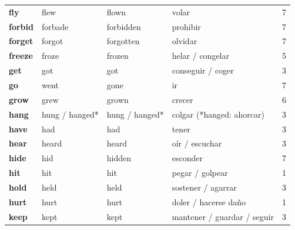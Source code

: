 \documentclass[11pt,a4paper]{article}
\begin{document}
\begin{longtable}{>{\bfseries}p{2.6cm}p{3.4cm}p{3.6cm}>{\raggedright\arraybackslash}p{6.0cm}c}
\textcolor{azulO}{fly} & \textcolor{azulO}{flew} & \textcolor{azulO}{flown} & \textcolor{azulO}{volar} & \textcolor{azulO}{7}\\
\textcolor{azulO}{forbid} & \textcolor{azulO}{forbade} & \textcolor{azulO}{forbidden} & \textcolor{azulO}{prohibir} & \textcolor{azulO}{7}\\
\textcolor{azulO}{forget} & \textcolor{azulO}{forgot} & \textcolor{azulO}{forgotten} & \textcolor{azulO}{olvidar} & \textcolor{azulO}{7}\\
\textcolor{rojoO}{freeze} & \textcolor{rojoO}{froze} & \textcolor{rojoO}{frozen} & \textcolor{rojoO}{helar / congelar} & \textcolor{rojoO}{5}\\
\textcolor{verdeO}{get} & \textcolor{verdeO}{got} & \textcolor{verdeO}{got} & \textcolor{verdeO}{conseguir / coger} & \textcolor{verdeO}{3}\\
\textcolor{azulO}{go} & \textcolor{azulO}{went} & \textcolor{azulO}{gone} & \textcolor{azulO}{ir} & \textcolor{azulO}{7}\\
\textcolor{rosaO}{grow} & \textcolor{rosaO}{grew} & \textcolor{rosaO}{grown} & \textcolor{rosaO}{crecer} & \textcolor{rosaO}{6}\\
\textcolor{verdeO}{hang} & \textcolor{verdeO}{hung / hanged*} & \textcolor{verdeO}{hung / hanged*} & \textcolor{verdeO}{colgar (*hanged: ahorcar)} & \textcolor{verdeO}{3}\\
\textcolor{verdeO}{have} & \textcolor{verdeO}{had} & \textcolor{verdeO}{had} & \textcolor{verdeO}{tener} & \textcolor{verdeO}{3}\\
\textcolor{verdeO}{hear} & \textcolor{verdeO}{heard} & \textcolor{verdeO}{heard} & \textcolor{verdeO}{oír / escuchar} & \textcolor{verdeO}{3}\\
\textcolor{azulO}{hide} & \textcolor{azulO}{hid} & \textcolor{azulO}{hidden} & \textcolor{azulO}{esconder} & \textcolor{azulO}{7}\\
\textcolor{amarilloO}{hit} & \textcolor{amarilloO}{hit} & \textcolor{amarilloO}{hit} & \textcolor{amarilloO}{pegar / golpear} & \textcolor{amarilloO}{1}\\
\textcolor{verdeO}{hold} & \textcolor{verdeO}{held} & \textcolor{verdeO}{held} & \textcolor{verdeO}{sostener / agarrar} & \textcolor{verdeO}{3}\\
\textcolor{amarilloO}{hurt} & \textcolor{amarilloO}{hurt} & \textcolor{amarilloO}{hurt} & \textcolor{amarilloO}{doler / hacerse daño} & \textcolor{amarilloO}{1}\\
\textcolor{verdeO}{keep} & \textcolor{verdeO}{kept} & \textcolor{verdeO}{kept} & \textcolor{verdeO}{mantener / guardar / seguir} & \textcolor{verdeO}{3}\\

\end{longtable}
\end{document}
